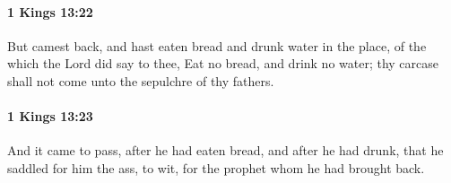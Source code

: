		\paragraph{1 Kings 13:22} %
			\label{1KINGS-13-22}

			But camest back, and hast eaten bread and drunk water in the place, of the which the Lord did say to thee, Eat no bread, and drink no water; thy carcase shall not come unto the sepulchre of thy fathers.


		\paragraph{1 Kings 13:23} %
			\label{1KINGS-13-23}

			And it came to pass, after he had eaten bread, and after he had drunk, that he saddled for him the ass, to wit, for the prophet whom he had brought back.


